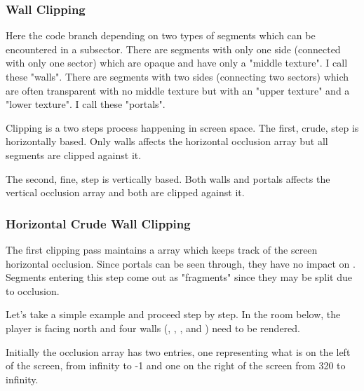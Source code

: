 \subsubsection{Wall Clipping}
Here the code branch depending on two types of segments which can be encountered in a subsector. There are segments with only one side (connected with only one sector) which are opaque and have only a "middle texture". I call these "walls". There are segments with two sides (connecting two sectors) which are often transparent with no middle texture but with an "upper texture" and a "lower texture". I call these "portals".\\
\par
Clipping is a two steps process happening in screen space. The first, crude, step is horizontally based. Only walls affects the horizontal occlusion array but all segments are clipped against it.\\
\par
The second, fine, step is vertically based. Both walls and portals affects the vertical occlusion array and both are clipped against it.\\
\par
\pagebreak









\subsubsection{Horizontal Crude Wall Clipping}
The first clipping pass maintains a  array which keeps track of the screen horizontal occlusion. Since portals can be seen through, they have no impact on . Segments entering this step come out as "fragments" since they may be split due to occlusion.\\
\par
{}
\par
Let's take a simple example and proceed step by step. In the room below, the player is facing north and four walls (, , , and ) need to be rendered.\\
\par
{}
\par
\vspace{-3mm}
Initially the occlusion array has two entries, one representing what is on the left of the screen, from infinity to -1 and one on the right of the screen from 320 to infinity.
\par 
\begin{minipage}{0.54\textwidth}
\vspace*{2.5mm}
\end{minipage}
\begin{minipage}{0.46\textwidth}
\end{minipage}
\par






